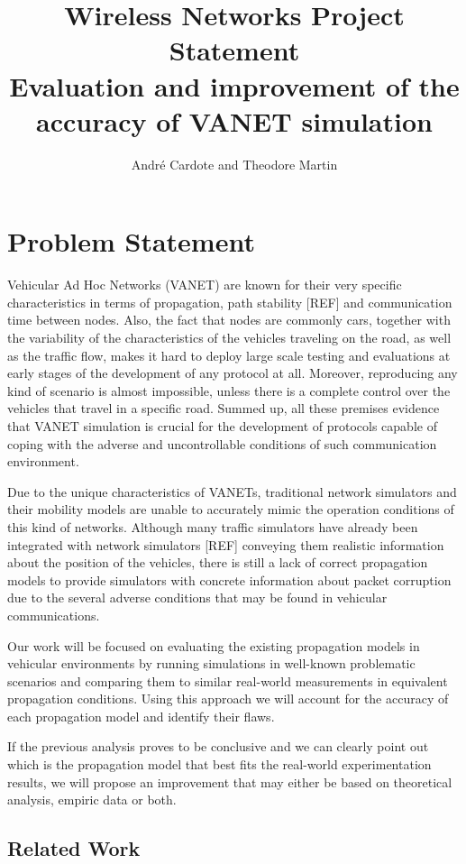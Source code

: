 \documentclass[12pt]{article}
\title{\vspace{-14ex} {\small \textbf{Wireless Networks Project Statement}} \\
		\vspace {3ex} Evaluation and improvement of the accuracy of VANET simulation}
\author{\small Andr\'e Cardote and Theodore Martin}
\date{}
\begin{document}
  \maketitle 
  
\section{Problem Statement}
Vehicular Ad Hoc Networks (VANET) are known for their very specific characteristics in terms of propagation, path stability [REF] and communication time between nodes. Also, the fact that nodes are commonly cars, together with the variability of the characteristics of the vehicles traveling on the road, as well as the traffic flow, makes it hard to deploy large scale testing and evaluations at early stages of the development of any protocol at all. Moreover, reproducing any kind of scenario is almost impossible, unless there is a complete control over the vehicles that travel in a specific road. Summed up, all these premises evidence that VANET simulation is crucial for the development of protocols capable of coping with the adverse and uncontrollable conditions of such communication environment.

Due to the unique characteristics of VANETs, traditional network simulators and their mobility models are unable to accurately mimic the operation conditions of this kind of networks. Although many traffic simulators have already been integrated with network simulators [REF] conveying them realistic information about the position of the vehicles, there is still a lack of correct propagation models to provide simulators with concrete information about packet corruption due to the several adverse conditions that may be found in vehicular communications.

Our work will be focused on evaluating the existing propagation models in vehicular environments by running simulations in well-known problematic scenarios and comparing them to similar real-world measurements in equivalent propagation conditions. Using this approach we will account for the accuracy of each propagation model and identify their flaws.

If the previous analysis proves to be conclusive and we can clearly point out which is the propagation model that best fits the real-world experimentation results, we will propose an improvement that may either be based on theoretical analysis, empiric data or both.

\subsection{Related Work}
\end{document}
